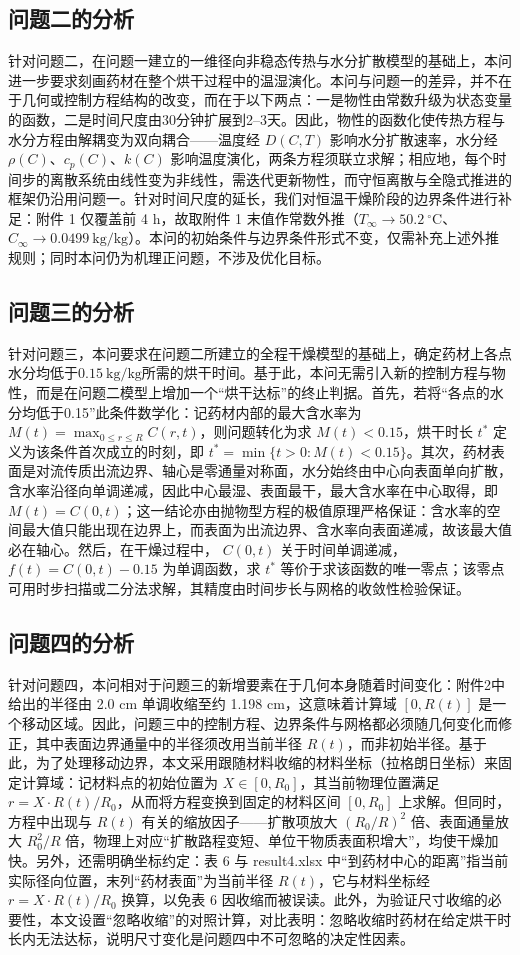 \documentclass[12pt,a4paper]{article}
\begin{document}
\subsection{问题二的分析}
针对问题二，在问题一建立的一维径向非稳态传热与水分扩散模型的基础上，本问进一步要求刻画药材在整个烘干过程中的温湿演化。本问与问题一的差异，并不在于几何或控制方程结构的改变，而在于以下两点：一是物性由常数升级为状态变量的函数，二是时间尺度由30分钟扩展到2--3天。因此，物性的函数化使传热方程与水分方程由解耦变为双向耦合——温度经 $D(C,T)$ 影响水分扩散速率，水分经 $\rho(C)$、$c_p(C)$、$k(C)$ 影响温度演化，两条方程须联立求解；相应地，每个时间步的离散系统由线性变为非线性，需迭代更新物性，而守恒离散与全隐式推进的框架仍沿用问题一。针对时间尺度的延长，我们对恒温干燥阶段的边界条件进行补足：附件 1 仅覆盖前 4 h，故取附件 1 末值作常数外推（$T_\infty\rightarrow50.2\ ^\circ\text{C}$、$C_\infty\rightarrow0.0499\ \text{kg/kg}$）。本问的初始条件与边界条件形式不变，仅需补充上述外推规则；同时本问仍为机理正问题，不涉及优化目标。

\subsection{问题三的分析}
针对问题三，本问要求在问题二所建立的全程干燥模型的基础上，确定药材上各点水分均低于$0.15\ \text{kg/kg}$所需的烘干时间。基于此，本问无需引入新的控制方程与物性，而是在问题二模型上增加一个“烘干达标”的终止判据。首先，若将“各点的水分均低于0.15”此条件数学化：记药材内部的最大含水率为 $M(t)=\max_{0\leq r\leq R} C(r,t)$，则问题转化为求 $M(t)<0.15$，烘干时长 $t^*$ 定义为该条件首次成立的时刻，即 $t^*=\min\{t>0: M(t)<0.15\}$。其次，药材表面是对流传质出流边界、轴心是零通量对称面，水分始终由中心向表面单向扩散，含水率沿径向单调递减，因此中心最湿、表面最干，最大含水率在中心取得，即 $M(t)=C(0,t)$；这一结论亦由抛物型方程的极值原理严格保证：含水率的空间最大值只能出现在边界上，而表面为出流边界、含水率向表面递减，故该最大值必在轴心。然后，在干燥过程中， $C(0,t)$ 关于时间单调递减，$f(t)=C(0,t)-0.15$ 为单调函数，求 $t^*$ 等价于求该函数的唯一零点；该零点可用时步扫描或二分法求解，其精度由时间步长与网格的收敛性检验保证。

\subsection{问题四的分析}
针对问题四，本问相对于问题三的新增要素在于几何本身随着时间变化：附件2中给出的半径由 2.0 cm 单调收缩至约 1.198 cm，这意味着计算域 $[0,R(t)]$ 是一个移动区域。因此，问题三中的控制方程、边界条件与网格都必须随几何变化而修正，其中表面边界通量中的半径须改用当前半径 $R(t)$，而非初始半径。基于此，为了处理移动边界，本文采用跟随材料收缩的材料坐标（拉格朗日坐标）来固定计算域：记材料点的初始位置为 $X\in[0,R_0]$，其当前物理位置满足 $r=X\cdot R(t)/R_0$，从而将方程变换到固定的材料区间 $[0,R_0]$ 上求解。但同时，方程中出现与 $R(t)$ 有关的缩放因子——扩散项放大 $(R_0/R)^2$ 倍、表面通量放大 $R_0^2/R$ 倍，物理上对应“扩散路程变短、单位干物质表面积增大”，均使干燥加快。另外，还需明确坐标约定：表 6 与 result4.xlsx 中“到药材中心的距离”指当前实际径向位置，末列“药材表面”为当前半径 $R(t)$，它与材料坐标经 $r=X\cdot R(t)/R_0$ 换算，以免表 6 因收缩而被误读。此外，为验证尺寸收缩的必要性，本文设置“忽略收缩”的对照计算，对比表明：忽略收缩时药材在给定烘干时长内无法达标，说明尺寸变化是问题四中不可忽略的决定性因素。
\end{document}
